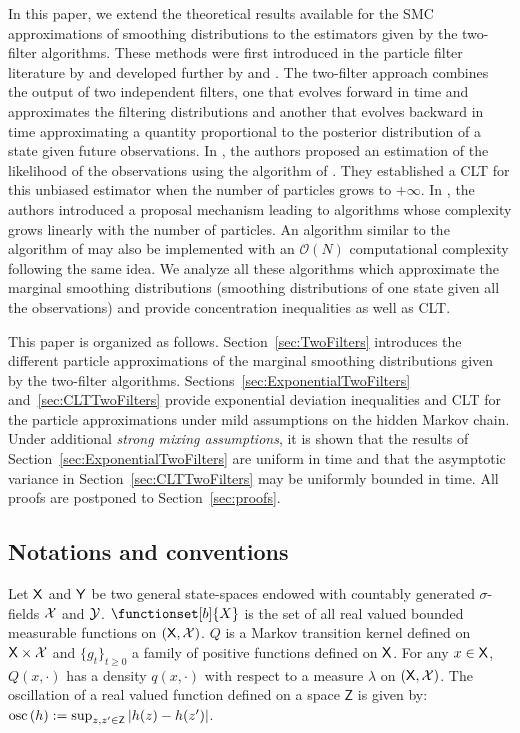 In this paper, we extend the theoretical results available for the SMC approximations of smoothing distributions to the estimators given by the two-filter algorithms. These methods were first introduced in the particle filter literature by \cite{kitagawa:1996} and developed further by \cite{briers:doucet:maskell:2010} and \cite{fearnhead:wyncoll:tawn:2010}. The two-filter approach combines the output of two independent filters, one that evolves forward in time and approximates the filtering distributions and another that evolves backward in time approximating a quantity proportional to the posterior distribution of a state given future observations.  In \cite{persing:jasra:2013}, the authors proposed an estimation of the likelihood of the observations using the algorithm of \cite{briers:doucet:maskell:2010}. They established a CLT for this unbiased estimator when the number of particles grows to $+\infty$. In \cite{fearnhead:wyncoll:tawn:2010}, the authors introduced a proposal mechanism leading to algorithms whose complexity grows linearly with the number of particles.  An algorithm similar to the algorithm of  \cite{briers:doucet:maskell:2010} may also be implemented with an $\mathcal{O}(N)$ computational complexity following the same idea. We analyze all these algorithms which approximate the marginal smoothing distributions (smoothing distributions of one state given all the observations) and provide concentration inequalities as well as CLT.

This paper is organized as follows. Section~\ref{sec:TwoFilters} introduces the different particle approximations of the marginal smoothing distributions given by the two-filter algorithms. Sections~\ref{sec:ExponentialTwoFilters} and~\ref{sec:CLTTwoFilters} provide exponential deviation inequalities and CLT for the particle approximations under mild assumptions on the hidden Markov chain. Under additional {\em strong mixing assumptions}, it is shown that the results of Section~\ref{sec:ExponentialTwoFilters} are uniform in time and that the asymptotic variance in Section~\ref{sec:CLTTwoFilters} may be uniformly bounded in time. All proofs are postponed to Section~\ref{sec:proofs}.

\subsection*{Notations and conventions}
Let $\mathsf{X}$ and $\mathsf{Y}$ be two general state-spaces endowed with countably generated $\sigma$-fields $\mathcal{X}$ and $\mathcal{Y}$. $\functionset[b]{X}$ is the set of all real valued bounded measurable functions on $(\mathsf{X},\mathcal{X})$. $Q$ is a Markov transition kernel defined on $\mathsf{X}\times\mathcal{X}$ and $\{g_{t}\}_{t\geq 0}$ a family of positive functions defined on $\mathsf{X}$. For any $x \in \mathsf{X}$, $Q(x,\cdot)$ has a density $q(x, \cdot)$ with respect to a measure $\lambda$ on $(\mathsf{X},\mathcal{X})$.  The oscillation of a real valued function defined on a space $\mathsf{Z}$ is given by:
$\oscnorm{h} \eqdef \sup_{z,z'\in\mathsf{Z}}\left|h(z)-h(z')\right|$.
